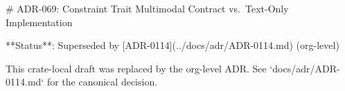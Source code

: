 # ADR-069: Constraint Trait Multimodal Contract vs.\ Text-Only Implementation

**Status**: Superseded by [ADR-0114](../docs/adr/ADR-0114.md) (org-level)

This crate-local draft was replaced by the org-level ADR. See `docs/adr/ADR-0114.md` for the canonical decision.
